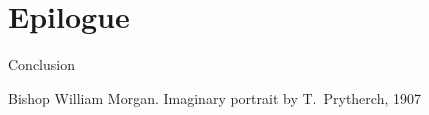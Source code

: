 \section{Epilogue}
 
\begin{frame}{Conclusion}
	\begin{center}

		{\scriptsize Bishop William Morgan. Imaginary portrait by T.\ Prytherch, 1907}
	\end{center}
\end{frame}
